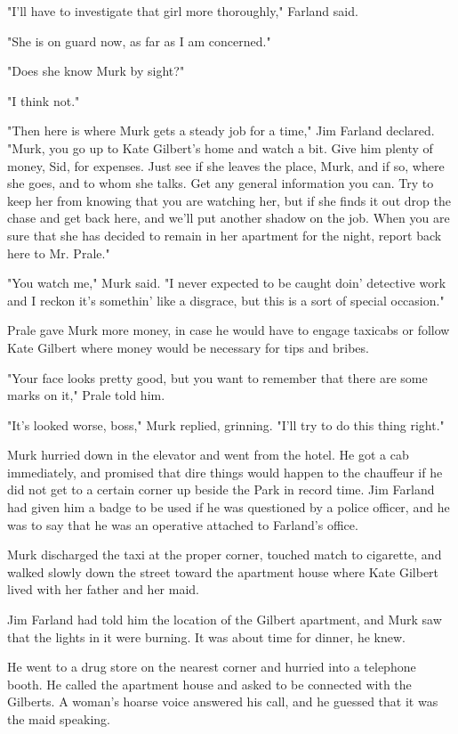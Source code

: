 \documentclass{novel}
\begin{document}
"I'll have to investigate that girl more thoroughly," Farland said.

"She is on guard now, as far as I am concerned."

"Does she know Murk by sight?"

"I think not."

"Then here is where Murk gets a steady job for a time," Jim Farland declared. "Murk, you go up to Kate Gilbert's home and watch a bit. Give him plenty of money, Sid, for expenses. Just see if she leaves the place, Murk, and if so, where she goes, and to whom she talks. Get any general information you can. Try to keep her from knowing that you are watching her, but if she finds it out drop the chase and get back here, and we'll put another shadow on the job. When you are sure that she has decided to remain in her apartment for the night, report back here to Mr. Prale."

"You watch me," Murk said. "I never expected to be caught doin' detective work and I reckon it's somethin' like a disgrace, but this is a sort of special occasion."

Prale gave Murk more money, in case he would have to engage taxicabs or follow Kate Gilbert where money would be necessary for tips and bribes.

"Your face looks pretty good, but you want to remember that there are some marks on it," Prale told him.

"It's looked worse, boss," Murk replied, grinning. "I'll try to do this thing right."

Murk hurried down in the elevator and went from the hotel. He got a cab immediately, and promised that dire things would happen to the chauffeur if he did not get to a certain corner up beside the Park in record time. Jim Farland had given him a badge to be used if he was questioned by a police officer, and he was to say that he was an operative attached to Farland's office.

Murk discharged the taxi at the proper corner, touched match to cigarette, and walked slowly down the street toward the apartment house where Kate Gilbert lived with her father and her maid.

Jim Farland had told him the location of the Gilbert apartment, and Murk saw that the lights in it were burning. It was about time for dinner, he knew.

He went to a drug store on the nearest corner and hurried into a telephone booth. He called the apartment house and asked to be connected with the Gilberts. A woman's hoarse voice answered his call, and he guessed that it was the maid speaking.
\end{document}
